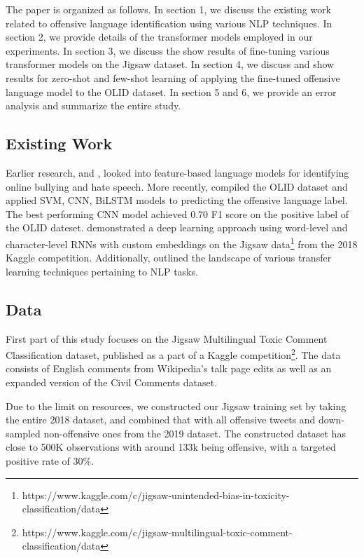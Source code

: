 \documentclass[11pt,a4paper]{article}
\begin{document}
The paper is organized as follows. In section 1, we discuss the existing work related to offensive language identification using various NLP techniques. In section 2, we provide details of the transformer models employed in our experiments. In section 3, we discuss the show results of fine-tuning various transformer models on the Jigsaw dataset. In section 4, we discuss and show results for zero-shot and few-shot learning of applying the fine-tuned offensive language model to the OLID dataset. In section 5 and 6, we provide an error analysis and summarize the entire study. 


\subsection{Existing Work}

Earlier research, \citep{6406271} and \citep{huang}, looked into feature-based language models for identifying online bullying and hate speech. More recently, \citep{zampieri-etal-2019-predicting} compiled the OLID dataset and applied SVM, CNN, BiLSTM models to predicting the offensive language label. The best performing CNN model achieved 0.70 F1 score on the positive label of the OLID dateset. \citep{kohli} demonstrated a deep learning approach using word-level and character-level RNNs with custom embeddings on the Jigsaw data\footnote{https://www.kaggle.com/c/jigsaw-unintended-bias-in-toxicity-classification/data} from the 2018 Kaggle competition. Additionally, \citep{ruder-etal-2019-transfer} outlined the landscape of various transfer learning techniques pertaining to NLP tasks.  

\subsection{Data}
First part of this study focuses on the Jigsaw Multilingual Toxic Comment Classification dataset, published as a part of a Kaggle competition\footnote{https://www.kaggle.com/c/jigsaw-multilingual-toxic-comment-classification/data}. The data consists of English comments from Wikipedia’s talk page edits as well as an expanded version of the Civil Comments dataset. 

Due to the limit on resources, we constructed our Jigsaw training set by taking the entire 2018 dataset, and combined that with all offensive tweets and down-sampled non-offensive ones from the 2019 dataset. The constructed dataset has close to 500K observations with around 133k being offensive, with a targeted positive rate of 30\%.
\end{document}
